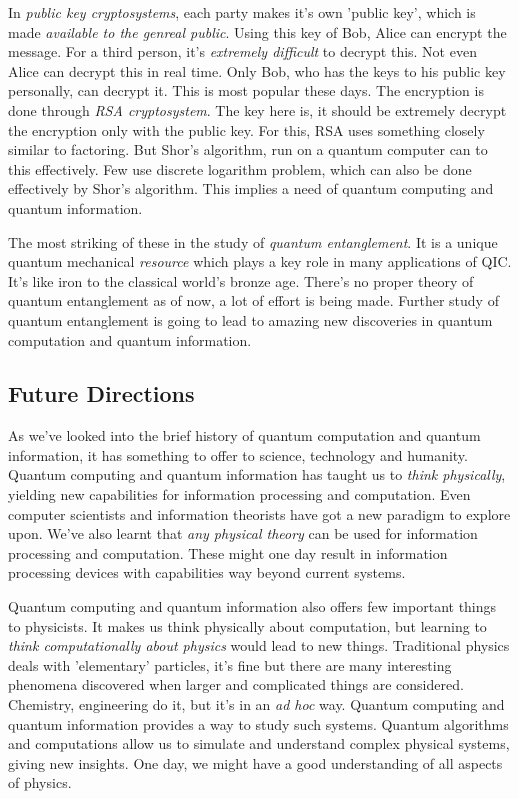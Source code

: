 In \textit{public key cryptosystems}, each party makes it's own 'public key', which is made \textit{available to the genreal public}. Using this key of Bob, Alice can encrypt the message. For a third person, it's \textit{extremely difficult} to decrypt this. Not even Alice can decrypt this in real time. Only Bob, who has the keys to his public key personally, can decrypt it. This is most popular these days. The encryption is done through \textit{RSA cryptosystem}. The key here is, it should be extremely decrypt the encryption only with the public key. For this, RSA uses something closely similar to factoring. But Shor's algorithm, run on a quantum computer can to this effectively. Few use discrete logarithm problem, which can also be done effectively by Shor's algorithm. This implies a need of quantum computing and quantum information.

The most striking of these in the study of \textit{quantum entanglement}. It is a unique quantum mechanical \textit{resource} which plays a key role in many applications of QIC. It's like iron to the classical world's bronze age. There's no proper theory of quantum entanglement as of now, a lot of effort is being made. Further study of quantum entanglement is going to lead to amazing new discoveries in quantum computation and quantum information.

\subsection{Future Directions}
As we've looked into the brief history of quantum computation and quantum information, it has something to offer to science, technology and humanity. Quantum computing and quantum information has taught us to \textit{think physically}, yielding new capabilities for information processing and computation. Even computer scientists and information theorists have got a new paradigm to explore upon. We've also learnt that \textit{any physical theory} can be used for information processing and computation. These might one day result in information processing devices with capabilities way beyond current systems. 

Quantum computing and quantum information also offers few important things to physicists. It makes us think physically about computation, but learning to \textit{think computationally about physics} would lead to new things. Traditional physics deals with 'elementary' particles, it's fine but there are many interesting phenomena discovered when larger and complicated things are considered. Chemistry, engineering do it, but it's in an \textit{ad hoc} way. Quantum computing and quantum information provides a way to study such systems. Quantum algorithms and computations allow us to simulate and understand complex physical systems, giving new insights. One day, we might have a good understanding of all aspects of physics.
